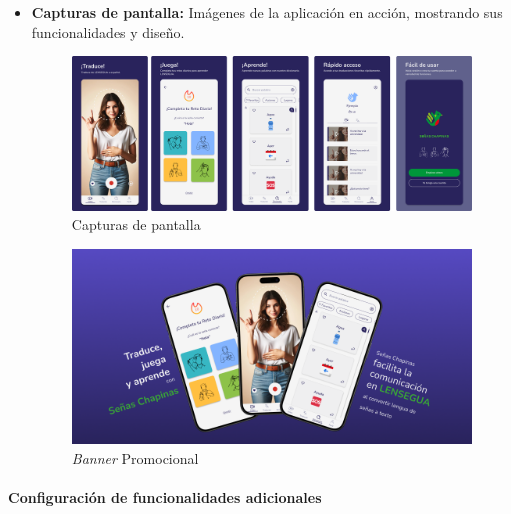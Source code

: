 \begin{itemize}
\begin{itemize}
        
        \item \textbf{Capturas de pantalla:} Imágenes de la aplicación en acción, mostrando sus funcionalidades y diseño.


        \begin{figure} [H]
            \centering
            \includegraphics[width=0.9\linewidth]{figuras/capturas_app.png}
            \caption{Capturas de pantalla}
            \label{fig:enter-label}
        \end{figure}

        \begin{figure} [H]
            \centering
            \includegraphics[width=0.9\linewidth]{figuras/promocional_app.png}
            \caption{\textit{Banner} Promocional}
            \label{fig:enter-label}
        \end{figure}
    \end{itemize}
\end{itemize}

\paragraph{Configuración de funcionalidades adicionales}

